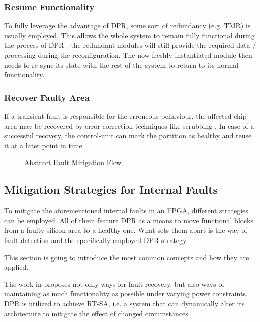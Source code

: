 \subsubsection{Resume Functionality}
    To fully leverage the advantage of \gls{DPR}, some sort of redundancy (e.g. \gls{TMR}) is usually employed.
    This allows the whole system to remain fully functional during the process of \gls{DPR} - the redundant modules will still provide the required data / processing during the reconfiguration. 
    The now freshly instantiated module then needs to re-sync its state with the rest of the system to return to its normal functionality.
\subsubsection{Recover Faulty Area}
    If a transient fault is responsible for the erroneous behaviour, the affected chip area may be recovered by error correction techniques like scrubbing \cite{reorda_error-detection_2017}. 
    In case of a successful recovery, the control-unit can mark the partition as healthy and reuse it at a later point in time.

\begin{center}
\begin{figure}[h]
    \centering
    \resizebox{\smallColumnWidth}{!} {
        
    }
\caption{Abstract Fault Mitigation Flow}
\label{fig:internalFaultFlow}
\end{figure}
\end{center}


\subsection{Mitigation Strategies for Internal Faults}\label{MitigationOfInternalFaults}

To mitigate the aforementioned internal faults in an \gls{FPGA}, different strategies can be employed.
All of them feature \gls{DPR} as a means to move functional blocks from a faulty silicon area to a healthy one.
What sets them apart is the way of fault detection and the specifically employed \gls{DPR} strategy.

This section is going to introduce the most common concepts and how they are applied. 

The work in \cite{sharma_run-time_2018} proposes not only ways for fault recovery, but also ways of maintaining as much functionality as possible under varying power constraints. 
\gls{DPR} is utilized to achieve \gls{RT-SA}, i.e. a system that can dynamically alter its architecture to mitigate the effect of changed circumstances.
